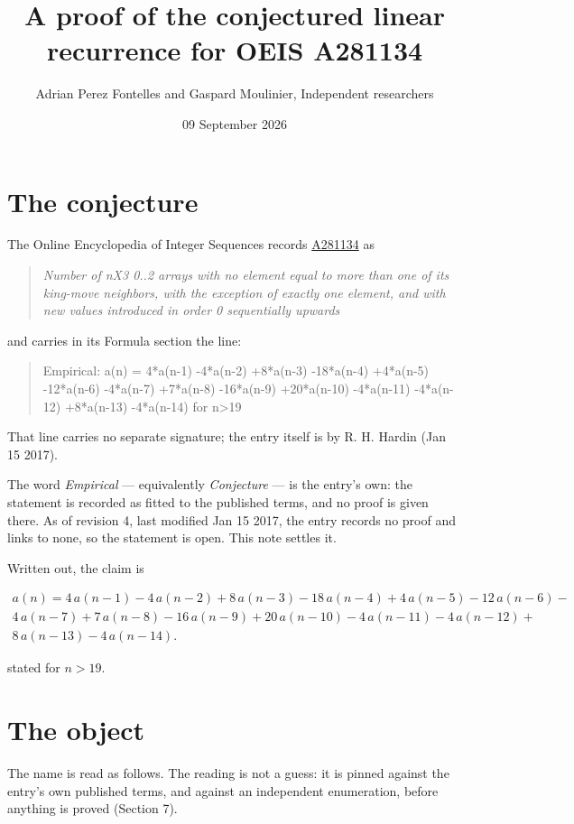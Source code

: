 \documentclass[11pt]{article}
\title{A proof of the conjectured linear recurrence for OEIS A281134}
\author{Adrian Perez Fontelles and Gaspard Moulinier, Independent researchers}
\date{09 September 2026}
\theoremstyle{definition}
\begin{document}
\maketitle
\section{The conjecture}

The Online Encyclopedia of Integer Sequences records \href{https://oeis.org/A281134}{A281134} as

\begin{quote}\itshape Number of nX3 0..2 arrays with no element equal to more than one of its king-move neighbors, with the exception of exactly one element, and with new values introduced in order 0 sequentially upwards\end{quote}

and carries in its Formula section the line:

\begin{quote}\ttfamily Empirical: a(n) = 4*a(n-1) -4*a(n-2) +8*a(n-3) -18*a(n-4) +4*a(n-5) -12*a(n-6) -4*a(n-7) +7*a(n-8) -16*a(n-9) +20*a(n-10) -4*a(n-11) -4*a(n-12) +8*a(n-13) -4*a(n-14) for n>19\end{quote}

That line carries no separate signature; the entry itself is by R. H. Hardin (Jan 15 2017).

The word {\itshape Empirical} --- equivalently {\itshape Conjecture} --- is the entry's own: the statement is recorded as fitted to the published terms, and no proof is given there. As of revision 4, last modified Jan 15 2017, the entry records no proof and links to none, so the statement is open. This note settles it.

Written out, the claim is

\begin{multline*} a(n) = 4\,a(n-1) - 4\,a(n-2) + 8\,a(n-3) - 18\,a(n-4) + 4\,a(n-5) - 12\,a(n-6) - \\ 4\,a(n-7) + 7\,a(n-8) - 16\,a(n-9) + 20\,a(n-10) - 4\,a(n-11) - 4\,a(n-12) + \\ 8\,a(n-13) - 4\,a(n-14). \end{multline*}

stated for $n > 19$.

\section{The object}

The name is read as follows. The reading is not a guess: it is pinned against the entry's own published terms, and against an independent enumeration, before anything is proved (Section 7).
\end{document}
